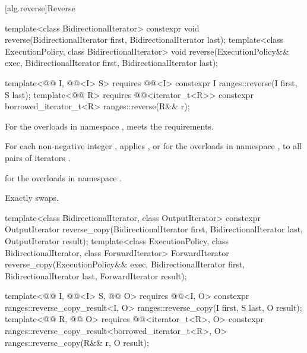 [alg.reverse]{Reverse}

%
\begin{itemdecl}
template<class BidirectionalIterator>
  constexpr void reverse(BidirectionalIterator first, BidirectionalIterator last);
template<class ExecutionPolicy, class BidirectionalIterator>
  void reverse(ExecutionPolicy&& exec,
               BidirectionalIterator first, BidirectionalIterator last);

template<@@ I, @@<I> S>
  requires @@<I>
  constexpr I ranges::reverse(I first, S last);
template<@@ R>
  requires @@<iterator_t<R>>
  constexpr borrowed_iterator_t<R> ranges::reverse(R&& r);
\end{itemdecl}

\begin{itemdescr}
\pnum
\expects
For the overloads in namespace ,
 meets
the  requirements.

\pnum
\effects
For each non-negative integer ,
applies , or
 for the overloads in namespace ,
to all pairs of iterators .

\pnum
\returns
{} for the overloads in namespace .

\pnum
\complexity
Exactly  swaps.
\end{itemdescr}

%
\begin{itemdecl}
template<class BidirectionalIterator, class OutputIterator>
  constexpr OutputIterator
    reverse_copy(BidirectionalIterator first, BidirectionalIterator last,
                 OutputIterator result);
template<class ExecutionPolicy, class BidirectionalIterator, class ForwardIterator>
  ForwardIterator
    reverse_copy(ExecutionPolicy&& exec,
                 BidirectionalIterator first, BidirectionalIterator last,
                 ForwardIterator result);

template<@@ I, @@<I> S, @@ O>
  requires @@<I, O>
  constexpr ranges::reverse_copy_result<I, O>
    ranges::reverse_copy(I first, S last, O result);
template<@@ R, @@ O>
  requires @@<iterator_t<R>, O>
  constexpr ranges::reverse_copy_result<borrowed_iterator_t<R>, O>
    ranges::reverse_copy(R&& r, O result);
\end{itemdecl}

